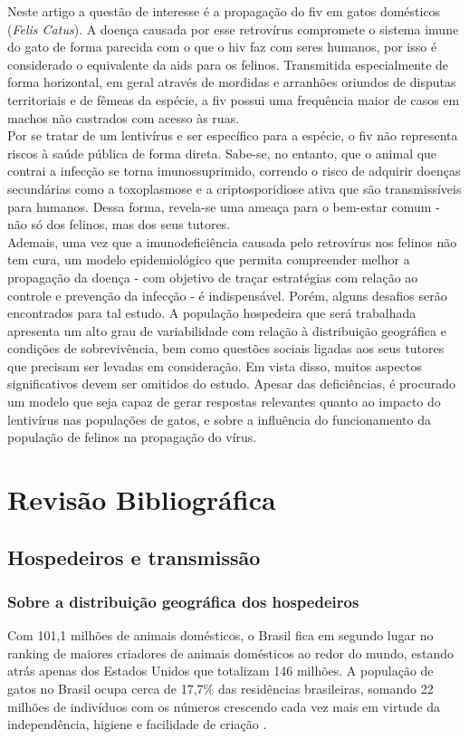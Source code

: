 \documentclass{article}
\begin{document}
\noindent Neste artigo a questão de interesse é a propagação do \gls{fiv} em gatos domésticos (\textit{Felis Catus}). A doença causada por esse retrovírus compromete o sistema imune do gato de forma parecida com o que o \gls{hiv} faz com seres humanos, por isso é considerado o equivalente da \gls{aids}  para os felinos. Transmitida especialmente de forma horizontal, em geral através de mordidas e arranhões oriundos de disputas territoriais e de fêmeas da espécie,  a \gls{fiv} possui uma frequência maior de casos em machos não castrados com acesso às ruas.\\

\noindent Por se tratar de um lentivírus e ser específico para a espécie, o \gls{fiv} não representa riscos à saúde pública de forma direta. Sabe-se, no entanto, que o animal que contrai a infecção se torna imunossuprimido, correndo o risco de adquirir doenças secundárias como a toxoplasmose e a criptosporidiose ativa que são transmissíveis para humanos. Dessa forma, revela-se uma ameaça para o bem-estar comum - não só dos felinos, mas dos seus tutores\cite{rayane}. \\

\noindent Ademais, uma vez que a imunodeficiência causada pelo retrovírus nos felinos não tem cura, um modelo epidemiológico que permita compreender melhor a propagação da doença - com objetivo de traçar estratégias com relação ao
controle e prevenção da infecção - é indispensável.
Porém, alguns desafios serão encontrados para tal estudo. A população hospedeira que será trabalhada apresenta um alto grau de variabilidade com relação à distribuição geográfica e condições de sobrevivência, bem como questões sociais ligadas aos seus tutores que precisam ser levadas em consideração. Em vista disso, muitos aspectos significativos devem ser omitidos do estudo. Apesar das deficiências, é procurado um modelo que seja capaz de gerar respostas relevantes quanto ao impacto do lentivírus nas populações de gatos, e sobre a influência do funcionamento da população de felinos na propagação do vírus.  \\

\newpage
\section{Revisão Bibliográfica}
\subsection{Hospedeiros e transmissão} 
\subsubsection{Sobre a distribuição geográfica dos hospedeiros}
Com 101,1 milhões de animais domésticos, o Brasil fica em segundo lugar no ranking de maiores criadores de animais domésticos ao redor do mundo, estando atrás apenas dos Estados Unidos que totalizam 146 milhões. A população de gatos no Brasil ocupa cerca de 17,7\%  das residências brasileiras, somando 22 milhões de indivíduos com os números crescendo cada vez mais em virtude da independência, higiene e facilidade de criação \cite{gomes}.\\
\end{document}
